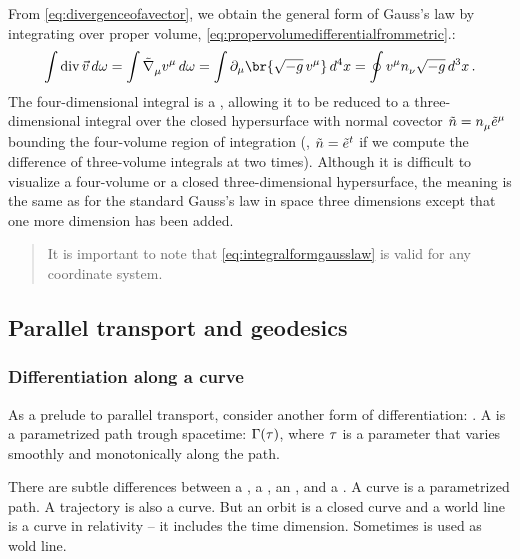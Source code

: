  From \cref{eq:divergenceofavector}, we obtain the general form of Gauss's law by integrating over proper volume, \cref{eq:propervolumedifferentialfrommetric}.:
%
\begin{equation}\label{eq:integralformgausslaw}
  \int\div\vec v\,d\vol = \int\tgradcov\mu \tvec v\mu\,d\vol 
                        = \int\ipd\mu\br{\sqrt{-\metric}\,\tvec v\mu}\,\tvolel 4
                        = \oint\tvec v\mu\tcov n\nu\sqrt{-\metric}\,\tvolel 3\,.
\end{equation}
%
 The four-dimensional integral is a , allowing it to be reduced to a three-dimensional integral over the closed hypersurface with normal covector $\cov n = \tcov n\mu\tbcov\mu$ bounding the four-volume region of integration (\eg, $\cov n = \tbcov t$ if we compute the difference of three-volume integrals at two times). Although it is difficult to visualize a four-volume or a closed three-dimensional hypersurface, the meaning is the same as for the standard Gauss's law in space three dimensions except that one more dimension has been added.
%
\begin{quotation}
  It is important to note that \cref{eq:integralformgausslaw} is valid for any coordinate system.
\end{quotation}


\subsection{Parallel transport and geodesics}

\subsubsection{Differentiation along a curve}
%
 As a prelude to parallel transport, consider another form of differentiation: . A  is a parametrized path trough spacetime: $\curve\vat\ptime$, where $\tau$ is a parameter that varies smoothly and monotonically along the path.

 There are subtle differences between a , a , an , and a . A curve is a parametrized path. A trajectory is also a curve. But an orbit is a closed curve and a world line is a curve in relativity -- it includes the time dimension. Sometimes  is used as wold line.

